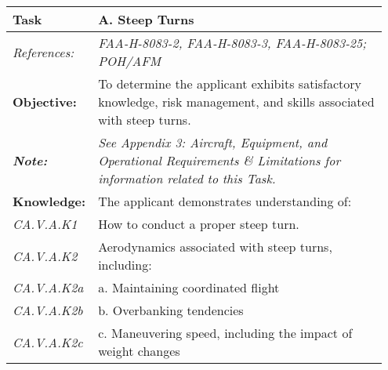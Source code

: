 {\begin{table}[H]
\begin{tabular}%
  {>{\raggedleft\arraybackslash}p{0.15\linewidth}%
   >{\raggedright\arraybackslash}p{0.8\linewidth}%
  }
\textbf{Task}                                                       & \textbf{A. Steep Turns}                                                                                                          \\ \hline
\textit{References:}                                                & \textit{FAA-H-8083-2, FAA-H-8083-3, FAA-H-8083-25; POH/AFM}                                                                      \\
\textbf{Objective:}                                                 & To determine the applicant exhibits satisfactory knowledge, risk management, and skills associated with steep turns.             \\
\textit{\textbf{Note:}}                                             & \textit{See Appendix 3: Aircraft, Equipment, and Operational Requirements \& Limitations for information related to this Task.}  \\ \hline
\textbf{Knowledge:}                                                 & The applicant demonstrates understanding of:                                                                                     \\
\textit{CA.V.A.K1}                                                  & How to conduct a proper steep turn.                                                                                              \\
\textit{CA.V.A.K2}                                                  & Aerodynamics associated with steep turns, including:                                                                             \\
\textit{CA.V.A.K2a}                                                 & a. Maintaining coordinated flight                                                                                                \\
\textit{CA.V.A.K2b}                                                 & b. Overbanking tendencies                                                                                                        \\
\textit{CA.V.A.K2c}                                                 & c. Maneuvering speed, including the impact of weight changes                                                                     \\

\end{tabular}
\end{table}}

